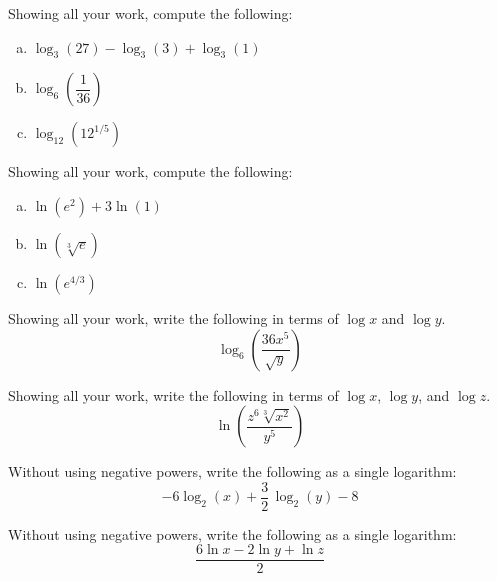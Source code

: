 \documentclass[11pt,letterpaper]{article}
\begin{document}

 Showing all your work, compute the following:
	\begin{enumerate}[(a)]
	\item $\log_3(27) - \log_3(3) + \log_3(1)$
	\item $\log_6 \left(\dfrac{1}{36} \right)$
	\item $\log_{12}(12^{1/5})$
	\end{enumerate}



\newpage



 Showing all your work, compute the following:
	\begin{enumerate}[(a)]
	\item $\ln(e^2) + 3 \ln(1)$
	\item $\ln(\sqrt[3]{e})$
	\item $\ln(e^{4/3})$
	\end{enumerate}



\newpage



 Showing all your work, write the following in terms of $\log x$ and $\log y$.
	\[
	\log_6\left( \dfrac{36x^5}{\sqrt{y}} \right)
	\]



\newpage



 Showing all your work, write the following in terms of $\log x$, $\log y$, and $\log z$. 
	\[
	\ln\left( \dfrac{z^6 \sqrt[3]{x^2}}{y^5} \right)
	\]



\newpage



 Without using negative powers, write the following as a single logarithm: 
	\[
	-6\log_2(x) + \frac{3}{2}\, \log_2(y) - 8
	\]



\newpage



 Without using negative powers, write the following as a single logarithm: 
	\[
	\dfrac{6\ln x - 2\ln y + \ln z}{2}
	\]
\end{document}
